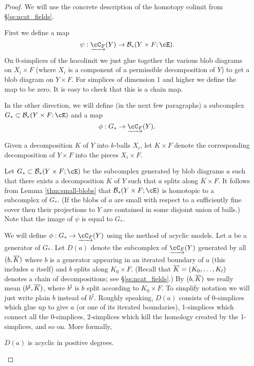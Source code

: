 \begin{proof}
We will use the concrete description of the homotopy colimit from \S\ref{ss:ncat_fields}.

First we define a map 
\[
	\psi: \cl{\cC_F}(Y) \to \bc_*(Y\times F;\cE) .
\]
On 0-simplices of the hocolimit 
we just glue together the various blob diagrams on $X_i\times F$
(where $X_i$ is a component of a permissible decomposition of $Y$) to get a blob diagram on
$Y\times F$.
For simplices of dimension 1 and higher we define the map to be zero.
It is easy to check that this is a chain map.

In the other direction, we will define (in the next few paragraphs) 
a subcomplex $G_*\sub \bc_*(Y\times F;\cE)$ and a map
\[
	\phi: G_* \to \cl{\cC_F}(Y) .
\]

Given a decomposition $K$ of $Y$ into $k$-balls $X_i$, let $K\times F$ denote the corresponding
decomposition of $Y\times F$ into the pieces $X_i\times F$.

Let $G_*\sub \bc_*(Y\times F;\cE)$ be the subcomplex generated by blob diagrams $a$ such that there
exists a decomposition $K$ of $Y$ such that $a$ splits along $K\times F$.
It follows from Lemma \ref{thm:small-blobs} that $\bc_*(Y\times F; \cE)$ 
is homotopic to a subcomplex of $G_*$.
(If the blobs of $a$ are small with respect to a sufficiently fine cover then their
projections to $Y$ are contained in some disjoint union of balls.)
Note that the image of $\psi$ is equal to $G_*$.

We will define $\phi: G_* \to \cl{\cC_F}(Y)$ using the method of acyclic models.
Let $a$ be a generator of $G_*$.
Let $D(a)$ denote the subcomplex of $\cl{\cC_F}(Y)$ generated by all $(b, \overline{K})$
where $b$ is a generator appearing
in an iterated boundary of $a$ (this includes $a$ itself)
and $b$ splits along $K_0\times F$.
(Recall that $\overline{K} = (K_0,\ldots,K_l)$ denotes a chain of decompositions;
see \S\ref{ss:ncat_fields}.)
By $(b, \overline{K})$ we really mean $(b^\sharp, \overline{K})$, where $b^\sharp$ is 
$b$ split according to $K_0\times F$.
To simplify notation we will just write plain $b$ instead of $b^\sharp$.
Roughly speaking, $D(a)$ consists of 0-simplices which glue up to give
$a$ (or one of its iterated boundaries), 1-simplices which connect all the 0-simplices, 
2-simplices which kill the homology created by the 
1-simplices, and so on.
More formally,
 
\begin{lemma} \label{lem:d-a-acyclic}
$D(a)$ is acyclic in positive degrees.
\end{lemma}


\end{proof}
